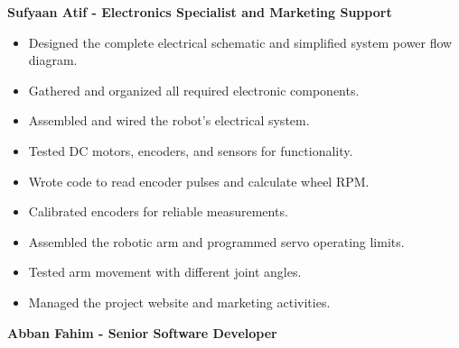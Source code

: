 \documentclass{article}
\begin{document}
\textbf{Sufyaan Atif - Electronics Specialist and Marketing Support}


\begin{itemize}
\footnotesize
  
\item Designed the complete electrical schematic and simplified system power flow diagram.
    
\item Gathered and organized all required electronic components.
    
\item Assembled and wired the robot's electrical system.
    
\item Tested DC motors, encoders, and sensors for functionality.
    
\item Wrote code to read encoder pulses and calculate wheel RPM.
    
\item Calibrated encoders for reliable measurements.
    
\item Assembled the robotic arm and programmed servo operating limits.
    
\item Tested arm movement with different joint angles.
    
\item Managed the project website and marketing activities.
\end{itemize}

\textbf{Abban Fahim - Senior Software Developer}
\end{document}
